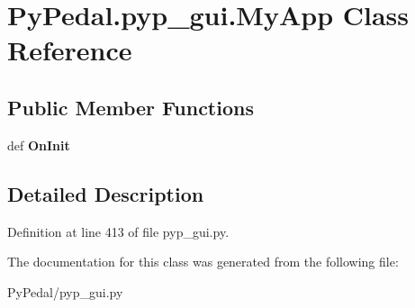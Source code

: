 \hypertarget{classPyPedal_1_1pyp__gui_1_1MyApp}{
\section{PyPedal.pyp\_\-gui.MyApp Class Reference}
\label{classPyPedal_1_1pyp__gui_1_1MyApp}
}
\subsection*{Public Member Functions}
\begin{DoxyCompactItemize}
\item 
\hypertarget{classPyPedal_1_1pyp__gui_1_1MyApp_a500dd4193016950a6e612b526c501cff}{
def {\bfseries OnInit}}
\label{classPyPedal_1_1pyp__gui_1_1MyApp_a500dd4193016950a6e612b526c501cff}

\end{DoxyCompactItemize}


\subsection{Detailed Description}


Definition at line 413 of file pyp\_\-gui.py.



The documentation for this class was generated from the following file:\begin{DoxyCompactItemize}
\item 
PyPedal/pyp\_\-gui.py\end{DoxyCompactItemize}
